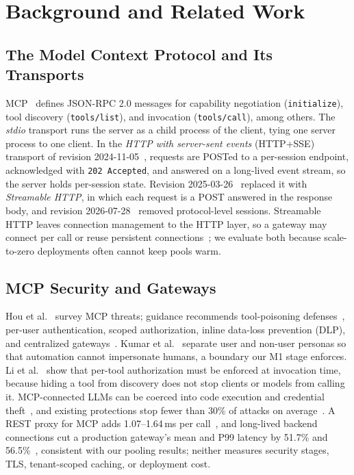 \documentclass{ieeeaccess}
\newcommand{\ms}{\,ms\xspace}
\begin{document}
\section{Background and Related Work}
\label{sec:related}

\subsection{The Model Context Protocol and Its Transports}
MCP~\cite{anthropic2024mcp} defines JSON-RPC 2.0 messages for capability negotiation (\texttt{initialize}), tool discovery (\texttt{tools/list}), and invocation (\texttt{tools/call}), among others. The \emph{stdio} transport runs the server as a child process of the client, tying one server process to one client. In the \emph{HTTP with server-sent events} (HTTP+SSE) transport of revision 2024-11-05~\cite{mcpspec20241105}, requests are POSTed to a per-session endpoint, acknowledged with \texttt{202 Accepted}, and answered on a long-lived event stream, so the server holds per-session state. Revision 2025-03-26~\cite{mcpspec20250326} replaced it with \emph{Streamable HTTP}, in which each request is a POST answered in the response body, and revision 2026-07-28~\cite{mcpspec20260728} removed protocol-level sessions. Streamable HTTP leaves connection management to the HTTP layer, so a gateway may connect per call or reuse persistent connections~\cite{mogul1995persistent,rfc9112}; we evaluate both because scale-to-zero deployments often cannot keep pools warm.

\subsection{MCP Security and Gateways}
Hou et al.~\cite{hou2025mcp} survey MCP threats; guidance recommends tool-poisoning defenses~\cite{narajala2025enterprise}, per-user authentication, scoped authorization, inline data-loss prevention (DLP), and centralized gateways~\cite{errico2025securing,brett2025simplified}. Kumar et al.~\cite{kumar2026gateway} separate user and non-user personas so that automation cannot impersonate humans, a boundary our M1 stage enforces. Li et al.~\cite{li2026zerotrust} show that per-tool authorization must be enforced at invocation time, because hiding a tool from discovery does not stop clients or models from calling it. MCP-connected LLMs can be coerced into code execution and credential theft~\cite{radosevich2025audit}, and existing protections stop fewer than 30\% of attacks on average~\cite{yang2025mcpsecbench}. A REST proxy for MCP adds 1.07--1.64\ms per call~\cite{ahmadi2025mcpbridge}, and long-lived backend connections cut a production gateway's mean and P99 latency by 51.7\% and 56.5\%~\cite{li2026mcpgateway}, consistent with our pooling results; neither measures security stages, TLS, tenant-scoped caching, or deployment cost.
\end{document}
